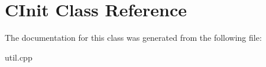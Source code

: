 \hypertarget{class_c_init}{}\section{C\+Init Class Reference}
\label{class_c_init}


The documentation for this class was generated from the following file\+:\begin{DoxyCompactItemize}
\item 
util.\+cpp\end{DoxyCompactItemize}

